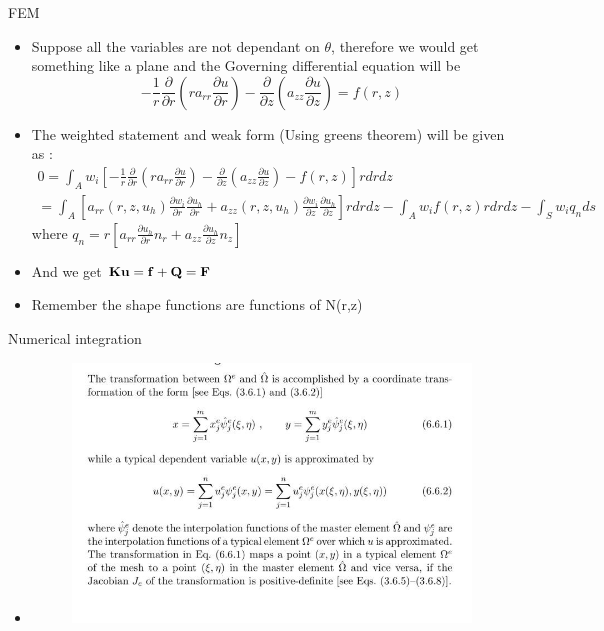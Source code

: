 	\begin{frame}{FEM}
		\begin{itemize}
			\item Suppose all the variables are not dependant on $\theta$, therefore we would get something like a plane and the Governing differential equation will be
			\begin{equation}
				-\frac{1}{r}\frac{\partial}{\partial r}\left(ra_{rr}\frac{\partial u}{\partial r} \right)
				- \frac{\partial}{\partial z}\left(a_{zz}\frac{\partial u}{\partial z} \right) = f(r,z)
			\end{equation}
			\item The weighted statement and weak form (Using greens theorem) will be given as :
			\begin{equation}
			\begin{aligned}
			 0 = \int_A w_i \left[ 	-\frac{1}{r}\frac{\partial}{\partial r}\left(ra_{rr}\frac{\partial u}{\partial r} \right)
			 - \frac{\partial}{\partial z}\left(a_{zz}\frac{\partial u}{\partial z} \right) - f(r,z)\right] rdrdz \\
			 = \int_A \left[ a_{rr}(r,z,u_h) \frac{\partial w_i}{\partial r}\frac{\partial u_h}{\partial r}
			 + a_{zz}(r,z,u_h) \frac{\partial w_i}{\partial z} \frac{\partial u_h}{\partial z}\right] rdrdz - \int_A w_if(r,z)rdrdz - \int_S w_iq_n ds 
			\end{aligned}
			\end{equation}
			where $q_n = r\left[ a_{rr} \frac{\partial u_h}{\partial r}n_r + a_{zz}\frac{\partial u_h}{\partial z} n_z\right]$
			\item And we get $\mathbf{Ku = f+Q = F}$
			\item Remember the shape functions are functions of N(r,z)	
	\end{itemize}
	\end{frame}


	\begin{frame}{Numerical integration}
		\begin{itemize}
			\item
			\begin{figure}
				\centering
				\includegraphics[width=0.9 \linewidth]{Figure/fig28} 		
			\end{figure} 
			
		\end{itemize}
	\end{frame}

